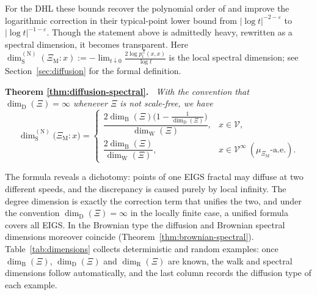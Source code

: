 \documentclass{article}
\newenvironment{restated}[1]{%
  \par\noindent\textbf{Theorem #1.}\itshape\ }%
  {\par}
\theoremstyle{plain}
\theoremstyle{definition}
\newcommand{\dimbox}{\dim_\mathrm{B}}
\newcommand{\dimdeg}{\dim_\mathrm{D}}
\newcommand{\dimwalk}{\dim_\mathrm{W}}
\newcommand{\dimresis}{\dim_\mathrm{R}}
\newcommand{\dimspec}{\dim_\mathrm{S}}
\begin{document}
For the DHL these bounds recover the polynomial order of \cite{hambly2010diffusion} and improve the logarithmic correction in their typical-point lower bound from $|\log t|^{-2-\varepsilon}$ to $|\log t|^{-1-\varepsilon}$.
Though the statement above is admittedly heavy,
rewritten as a spectral dimension, it becomes transparent.
Here $\dimspec^{(\mathrm N)}(\Xi_{\mathrm M}:x):=-\lim_{t\downarrow 0}\frac{2\log p_t^\Xi(x,x)}{\log t}$ is the local spectral dimension; see Section~\ref{sec:diffusion} for the formal definition.

\begin{restated}{\ref{thm:diffusion-spectral}}
With the convention that $\dimdeg(\Xi)=\infty$ whenever $\Xi$ is not scale-free, we have
\[
\dimspec^{(\mathrm N)}\bigl(\Xi_{\mathrm M}:x\bigr)
=
\begin{cases}
\dfrac{2\dimbox(\Xi)\bigl(1-\frac{1}{\dimdeg(\Xi)}\bigr)}{\dimwalk(\Xi)}, & x\in\mathscr V,\\[2ex]
\dfrac{2\dimbox(\Xi)}{\dimwalk(\Xi)}, & x\in\mathscr V^\infty\ (\mu_{\Xi_{\mathrm M}}\text{-a.e.}).
\end{cases}
\]
\end{restated}

The formula reveals a dichotomy: points of one EIGS fractal may diffuse at two different speeds, and the discrepancy is caused purely by local infinity.
The degree dimension is exactly the correction term that unifies the two, and under the convention $\dimdeg(\Xi)=\infty$ in the locally finite case, a unified formula covers all EIGS.
In the Brownian type the diffusion and Brownian spectral dimensions moreover coincide (Theorem~\ref{thm:brownian-spectral}).
Table~\ref{tab:dimensions} collects deterministic and random examples: once $\dimbox(\Xi)$, $\dimdeg(\Xi)$ and $\dimresis(\Xi)$ are known, the walk and spectral dimensions follow automatically, and the last column records the diffusion type of each example.
\end{document}
